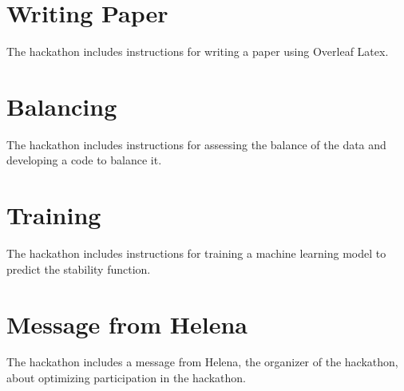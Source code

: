 \documentclass{article}
\begin{document}
\section{Writing Paper}

The hackathon includes instructions for writing a paper using Overleaf Latex.

\section{Balancing}

The hackathon includes instructions for assessing the balance of the data and developing a code to balance it.

\section{Training}

The hackathon includes instructions for training a machine learning model to predict the stability function.

\section{Message from Helena}

The hackathon includes a message from Helena, the organizer of the hackathon, about optimizing participation in the hackathon.
\end{document}
